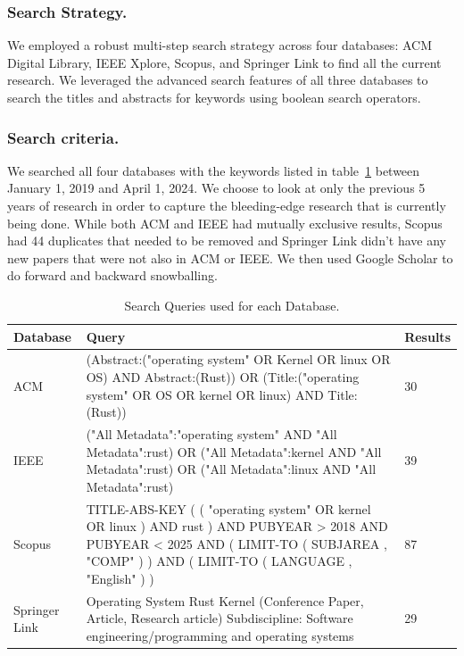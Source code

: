 \documentclass[sigconf]{acmart}
\begin{document}
\subsubsection{\textbf{Search Strategy.}}

We employed a robust multi-step search strategy across four databases: ACM Digital Library,
IEEE Xplore, Scopus, and Springer Link to find all the current research.
We leveraged the advanced search features of all three databases to search the titles and abstracts for
keywords using boolean search operators.


\subsubsection{\textbf{Search criteria.}}

We searched all four databases with the keywords listed in table~\ref{tab:keywords} between January
1, 2019 and April 1, 2024. We choose to look at only the previous 5 years of research in order to capture the
bleeding-edge research that is currently being done. While both ACM and IEEE had mutually exclusive results, Scopus had 44
duplicates that needed to be removed and Springer Link didn't have any new papers that were not also in ACM or IEEE. We then used Google Scholar to do forward and backward snowballing.

\begin{table}
\begin{tabular}{|| p{2cm}| p{4cm} | p{1cm} ||}
 \hline
 Database & Query & Results \\
 \hline\hline
 ACM  & (Abstract:("operating system" OR Kernel OR linux OR OS) AND Abstract:(Rust)) OR (Title:("operating system" OR OS OR kernel OR linux) AND Title:(Rust))  & 30 \\
 IEEE & ("All Metadata":"operating system" AND "All Metadata":rust) OR ("All Metadata":kernel AND
 "All Metadata":rust) OR ("All Metadata":linux AND "All Metadata":rust) & 39 \\
 Scopus & TITLE-ABS-KEY ( ( "operating system" OR kernel OR linux ) AND rust ) AND PUBYEAR > 2018
 AND PUBYEAR < 2025 AND ( LIMIT-TO ( SUBJAREA , "COMP" ) ) AND ( LIMIT-TO ( LANGUAGE , "English" ) )
 & 87 \\
 Springer Link & Operating System Rust Kernel (Conference Paper, Article, Research article) Subdiscipline: Software engineering/programming and operating systems & 29 \\
 \hline
\end{tabular}
\caption{Search Queries used for each Database.}
\label{tab:keywords}
\end{table}
\end{document}
